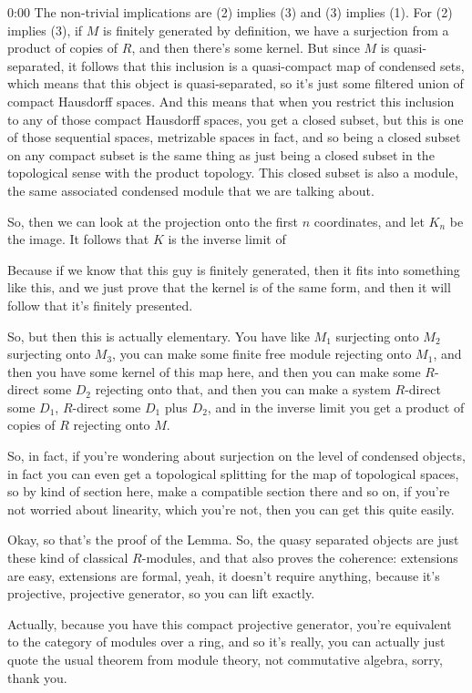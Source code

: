 \begin{unfinished}{0:00}
The non-trivial implications are (2) implies (3) and (3) implies (1). For (2) implies (3), if $M$ is finitely generated by definition, we have a surjection from a product of copies of $R$, and then there's some kernel. But since $M$ is quasi-separated, it follows that this inclusion is a quasi-compact map of condensed sets, which means that this object is quasi-separated, so it's just some filtered union of compact Hausdorff spaces. And this means that when you restrict this inclusion to any of those compact Hausdorff spaces, you get a closed subset, but this is one of those sequential spaces, metrizable spaces in fact, and so being a closed subset on any compact subset is the same thing as just being a closed subset in the topological sense with the product topology. This closed subset is also a module, the same associated condensed module that we are talking about.

So, then we can look at the projection onto the first $n$ coordinates, and let $K_n$ be the image. It follows that $K$ is the inverse limit of

Because if we know that this guy is finitely generated, then it fits into something like this, and we just prove that the kernel is of the same form, and then it will follow that it's finitely presented.

So, but then this is actually elementary. You have like $M_1$ surjecting onto $M_2$ surjecting onto $M_3$, you can make some finite free module rejecting onto $M_1$, and then you have some kernel of this map here, and then you can make some $R$-direct some $D_2$ rejecting onto that, and then you can make a system $R$-direct some $D_1$, $R$-direct some $D_1$ plus $D_2$, and in the inverse limit you get a product of copies of $R$ rejecting onto $M$.

So, in fact, if you're wondering about surjection on the level of condensed objects, in fact you can even get a topological splitting for the map of topological spaces, so by kind of section here, make a compatible section there and so on, if you're not worried about linearity, which you're not, then you can get this quite easily.

Okay, so that's the proof of the Lemma. So, the quasy separated objects are just these kind of classical $R$-modules, and that also proves the coherence: extensions are easy, extensions are formal, yeah, it doesn't require anything, because it's projective, projective generator, so you can lift exactly.

Actually, because you have this compact projective generator, you're equivalent to the category of modules over a ring, and so it's really, you can actually just quote the usual theorem from module theory, not commutative algebra, sorry, thank you.


\end{unfinished}
